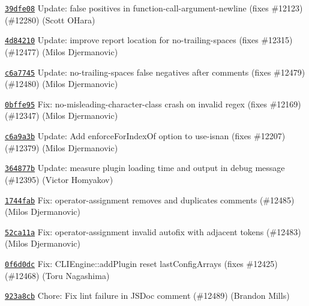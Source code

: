 \begin{DoxyItemize}
\item \href{https://github.com/eslint/eslint/commit/39dfe0880fa934e287e8ea1f7b56d5cba8d43765}{\texttt{ {\ttfamily 39dfe08}}} Update\+: false positives in function-\/call-\/argument-\/newline (fixes \#12123) (\#12280) (Scott O\textquotesingle{}Hara)
\item \href{https://github.com/eslint/eslint/commit/4d842105c9c82026be668d7425213138903d4d41}{\texttt{ {\ttfamily 4d84210}}} Update\+: improve report location for no-\/trailing-\/spaces (fixes \#12315) (\#12477) (Milos Djermanovic)
\item \href{https://github.com/eslint/eslint/commit/c6a7745a1371a85932bfae5fec039d1b6fcfc128}{\texttt{ {\ttfamily c6a7745}}} Update\+: no-\/trailing-\/spaces false negatives after comments (fixes \#12479) (\#12480) (Milos Djermanovic)
\item \href{https://github.com/eslint/eslint/commit/0bffe953d2752dd2d3045f2f8771c96b6cee8fc4}{\texttt{ {\ttfamily 0bffe95}}} Fix\+: no-\/misleading-\/character-\/class crash on invalid regex (fixes \#12169) (\#12347) (Milos Djermanovic)
\item \href{https://github.com/eslint/eslint/commit/c6a9a3bc58b69dbf9be9cd09b0283c081ca211e7}{\texttt{ {\ttfamily c6a9a3b}}} Update\+: Add enforce\+For\+Index\+Of option to use-\/isnan (fixes \#12207) (\#12379) (Milos Djermanovic)
\item \href{https://github.com/eslint/eslint/commit/364877b2504e8f7ece04770b93d517e2f27458d0}{\texttt{ {\ttfamily 364877b}}} Update\+: measure plugin loading time and output in debug message (\#12395) (Victor Homyakov)
\item \href{https://github.com/eslint/eslint/commit/1744faba3c93c869f7dbbf0a704d32e2692d6856}{\texttt{ {\ttfamily 1744fab}}} Fix\+: operator-\/assignment removes and duplicates comments (\#12485) (Milos Djermanovic)
\item \href{https://github.com/eslint/eslint/commit/52ca11a66ab6c2fb5a71d8b9869482f14f98cb9d}{\texttt{ {\ttfamily 52ca11a}}} Fix\+: operator-\/assignment invalid autofix with adjacent tokens (\#12483) (Milos Djermanovic)
\item \href{https://github.com/eslint/eslint/commit/0f6d0dcdf5adc30079a7379bbf605a4ef3887a85}{\texttt{ {\ttfamily 0f6d0dc}}} Fix\+: C\+L\+I\+Engine\+::add\+Plugin reset last\+Config\+Arrays (fixes \#12425) (\#12468) (Toru Nagashima)
\item \href{https://github.com/eslint/eslint/commit/923a8cb752b8dee1e622c5fd36f3f53288e30602}{\texttt{ {\ttfamily 923a8cb}}} Chore\+: Fix lint failure in J\+S\+Doc comment (\#12489) (Brandon Mills)

\end{DoxyItemize}
